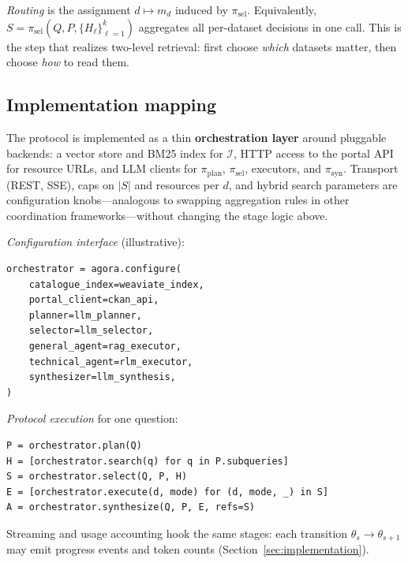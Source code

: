 \documentclass[sigconf,anonymous]{acmart}
\begin{document}
\emph{Routing} is the assignment $d \mapsto m_d$ induced by $\pi_{\mathrm{sel}}$. Equivalently, $S=\pi_{\mathrm{sel}}(Q,P,\{H_\ell\}_{\ell=1}^{k})$ aggregates all per-dataset decisions in one call. This is the step that realizes two-level retrieval: first choose \emph{which} datasets matter, then choose \emph{how} to read them.

\subsection{Implementation mapping}
\label{sec:protocol-implementation}

The protocol is implemented as a thin \textbf{orchestration layer} around pluggable backends: a vector store and BM25 index for $\mathcal{I}$, HTTP access to the portal API for resource URLs, and LLM clients for $\pi_{\mathrm{plan}}$, $\pi_{\mathrm{sel}}$, executors, and $\pi_{\mathrm{syn}}$. Transport (REST, SSE), caps on $|S|$ and resources per $d$, and hybrid search parameters are configuration knobs---analogous to swapping aggregation rules in other coordination frameworks---without changing the stage logic above.

\noindent\textit{Configuration interface} (illustrative):
\begin{small}
\begin{verbatim}
orchestrator = agora.configure(
    catalogue_index=weaviate_index,
    portal_client=ckan_api,
    planner=llm_planner,
    selector=llm_selector,
    general_agent=rag_executor,
    technical_agent=rlm_executor,
    synthesizer=llm_synthesis,
)
\end{verbatim}
\end{small}

\noindent\textit{Protocol execution} for one question:
\begin{small}
\begin{verbatim}
P = orchestrator.plan(Q)
H = [orchestrator.search(q) for q in P.subqueries]
S = orchestrator.select(Q, P, H)
E = [orchestrator.execute(d, mode) for (d, mode, _) in S]
A = orchestrator.synthesize(Q, P, E, refs=S)
\end{verbatim}
\end{small}

\noindent Streaming and usage accounting hook the same stages: each transition $\theta_s \!\to\! \theta_{s+1}$ may emit progress events and token counts (Section~\ref{sec:implementation}).

\end{document}
